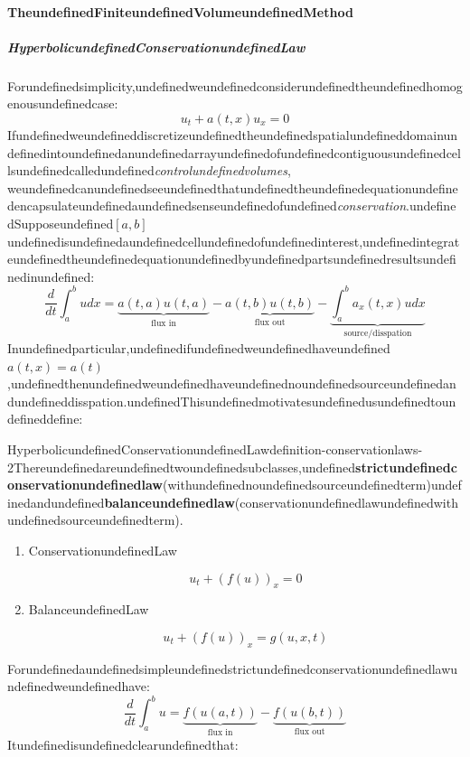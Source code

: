 \paragraph{TheundefinedFiniteundefinedVolumeundefinedMethod}

\subparagraph{HyperbolicundefinedConservationundefinedLaw}

Forundefinedsimplicity,undefinedweundefinedconsiderundefinedtheundefinedhomogenousundefinedcase:
\begin{equation}
u_t + a(t,x)u_x = 0
\end{equation}
Ifundefinedweundefineddiscretizeundefinedtheundefinedspatialundefineddomainundefinedintoundefinedanundefinedarrayundefinedofundefinedcontiguousundefinedcellsundefinedcalledundefined\textit{controlundefinedvolumes},
weundefinedcanundefinedseeundefinedthatundefinedtheundefinedequationundefinedencapsulateundefinedaundefinedsenseundefinedofundefined\textit{conservation}.undefinedSupposeundefined$[a,b]$undefinedisundefinedaundefinedcellundefinedofundefinedinterest,undefinedintegrateundefinedtheundefinedequationundefinedbyundefinedpartsundefinedresultsundefinedinundefined:
\begin{equation}
\frac{d}{dt}\int_{a}^b u  dx = \underbrace{a(t,a)u(t,a)}_{\text{flux in}}-\underbrace{a(t,b)u(t,b)}_{\text{flux out}} - \underbrace{\int_a^b a_x(t,x)udx}_{\text{source/disspation}}
\end{equation}
Inundefinedparticular,undefinedifundefinedweundefinedhaveundefined$a(t,x)=a(t)$,undefinedthenundefinedweundefinedhaveundefinednoundefinedsourceundefinedandundefineddisspation.undefinedThisundefinedmotivatesundefinedusundefinedtoundefineddefine:

\begin{mystthmdefinition}{HyperbolicundefinedConservationundefinedLaw}{definition-conservationlaws-2}Thereundefinedareundefinedtwoundefinedsubclasses,undefined\textbf{strictundefinedconservationundefinedlaw}(withundefinednoundefinedsourceundefinedterm)undefinedandundefined\textbf{balanceundefinedlaw}(conservationundefinedlawundefinedwithundefinedsourceundefinedterm).

\begin{enumerate}
\item ConservationundefinedLaw

\begin{equation}
u_t + (f(u))_x = 0
\end{equation}


\item BalanceundefinedLaw

\begin{equation}
u_t + (f(u))_x = g(u,x,t)
\end{equation}
\end{enumerate}

\end{mystthmdefinition}
Forundefinedaundefinedsimpleundefinedstrictundefinedconservationundefinedlawundefinedweundefinedhave:
\begin{equation}
\frac{d}{dt}\int_a^b u = \underbrace{f(u(a,t))}_{\text{flux in}}-\underbrace{f(u(b,t))}_{\text{flux out}}
\end{equation}
Itundefinedisundefinedclearundefinedthat:

